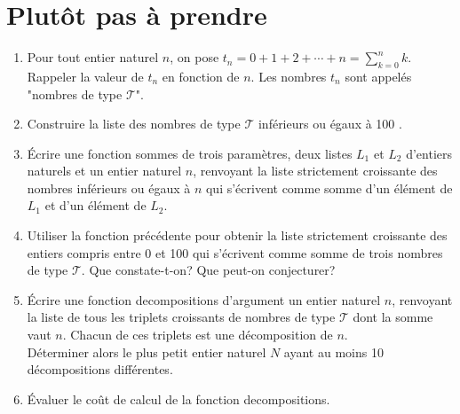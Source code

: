 \section{Plutôt pas à prendre}


\begin{exercice}
\begin{enumerate}
  \item Pour tout entier naturel $n$, on pose $t_{n}=0+1+2+\cdots+n=\displaystyle \sum_{k=0}^{n} k$. Rappeler la valeur de $t_{n}$ en fonction de $n$. Les nombres $t_{n}$ sont appelés "nombres de type $\mathcal{T}$".

\item Construire la liste des nombres de type $\mathcal{T}$ inférieurs ou égaux à 100 .

  \item Écrire une fonction sommes de trois paramètres, deux listes $L_{1}$ et $L_{2}$ d'entiers naturels et un entier naturel $n$, renvoyant la liste strictement croissante des nombres inférieurs ou égaux à $n$ qui s'écrivent comme somme d'un élément de $L_{1}$ et d'un élément de $L_{2}$.

  \item Utiliser la fonction précédente pour obtenir la liste strictement croissante des entiers compris entre 0 et 100 qui s'écrivent comme somme de trois nombres de type $\mathcal{T}$. Que constate-t-on? Que peut-on conjecturer?

  \item Écrire une fonction decompositions d'argument un entier naturel $n$, renvoyant la liste de tous les triplets croissants de nombres de type $\mathcal{T}$ dont la somme vaut $n$. Chacun de ces triplets est une décomposition de $n$.\\
Déterminer alors le plus petit entier naturel $N$ ayant au moins 10 décompositions différentes.
  \item Évaluer le coût de calcul de la fonction decompositions.
\end{enumerate}
\end{exercice}


